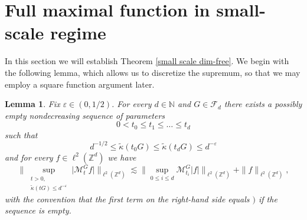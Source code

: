 \documentclass[a4paper,oneside, reqno]{amsart}
\numberwithin{equation}{section}
\newtheorem{Lem}[Thm]{Lemma}
\theoremstyle{definition}%
\theoremstyle{definition}
\theoremstyle{definition}%
\theoremstyle{definition}
\newcommand{\Z}{\mathbb{Z}}
\newcommand{\N}{\mathbb{N}}
\begin{document}
\section{Full maximal function in small-scale regime}
In this section we will establish Theorem \ref{small scale dim-free}.
We begin with the following lemma, which allows us to discretize the supremum, so that we may employ a square function argument later.
\begin{Lem} \label{discretized supremum}
Fix $\varepsilon \in (0,1/2)$. For every $d \in \N$ and $G \in \mathcal{F}_d$ there exists a possibly empty nondecreasing sequence of parameters 
\[
0<t_0 \le t_1 \le \ldots \le t_d
\]
such that
\[d^{-1/2} \le \widetilde{\kappa}(t_0 G) \le \widetilde{\kappa}(t_d G) \le d^{-\varepsilon}
\]
and for every $f \in \ell^2(\Z^d)$ we have
\[
\Big\|\sup_{\substack{t>0, \\
 \widetilde{\kappa}(tG) \le d^{-\varepsilon}}} \big|\mathcal{M}_{t}^Gf\big| \Big\|_{\ell^2(\Z^d)} \lesssim \Big\|\sup_{0 \le i \le d} \mathcal{M}_{t_i}^G\big|f\big| \Big\|_{\ell^2(\Z^d)} + \|
 f\|_{\ell^2(\Z^d)},
\]
with the convention that the first term on the right-hand side equals $)$ if the sequence is empty.
\end{Lem}
\end{document}
